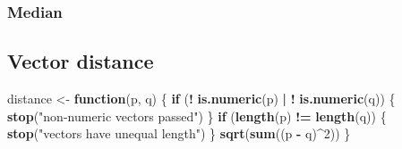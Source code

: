 \documentclass[]{book}
\newenvironment{Shaded}{\begin{snugshade}}{\end{snugshade}}
\newcommand{\CommentTok}[1]{\textcolor[rgb]{0.56,0.35,0.01}{\textit{#1}}}
\newcommand{\ControlFlowTok}[1]{\textcolor[rgb]{0.13,0.29,0.53}{\textbf{#1}}}
\newcommand{\DecValTok}[1]{\textcolor[rgb]{0.00,0.00,0.81}{#1}}
\newcommand{\KeywordTok}[1]{\textcolor[rgb]{0.13,0.29,0.53}{\textbf{#1}}}
\newcommand{\NormalTok}[1]{#1}
\newcommand{\OperatorTok}[1]{\textcolor[rgb]{0.81,0.36,0.00}{\textbf{#1}}}
\newcommand{\StringTok}[1]{\textcolor[rgb]{0.31,0.60,0.02}{#1}}
\begin{document}
\hypertarget{median-1}{%
\subsubsection*{Median}\label{median-1}}

\begin{Shaded}
\end{Shaded}

\hypertarget{vector-distance-1}{%
\subsection{Vector distance}\label{vector-distance-1}}

\begin{Shaded}
\begin{Highlighting}[]
\NormalTok{distance <-}\StringTok{ }\ControlFlowTok{function}\NormalTok{(p, q) \{}
    \ControlFlowTok{if}\NormalTok{ (}\OperatorTok{!}\StringTok{ }\KeywordTok{is.numeric}\NormalTok{(p) }\OperatorTok{|}\StringTok{ }\OperatorTok{!}\StringTok{ }\KeywordTok{is.numeric}\NormalTok{(q)) \{}
        \KeywordTok{stop}\NormalTok{(}\StringTok{"non-numeric vectors passed"}\NormalTok{)}
\NormalTok{    \}}
    \ControlFlowTok{if}\NormalTok{ (}\KeywordTok{length}\NormalTok{(p) }\OperatorTok{!=}\StringTok{ }\KeywordTok{length}\NormalTok{(q)) \{}
        \KeywordTok{stop}\NormalTok{(}\StringTok{"vectors have unequal length"}\NormalTok{)}
\NormalTok{    \}}
    \KeywordTok{sqrt}\NormalTok{(}\KeywordTok{sum}\NormalTok{((p }\OperatorTok{-}\StringTok{ }\NormalTok{q)}\OperatorTok{^}\DecValTok{2}\NormalTok{))}
\NormalTok{\}}
\end{Highlighting}
\end{Shaded}
\end{document}
